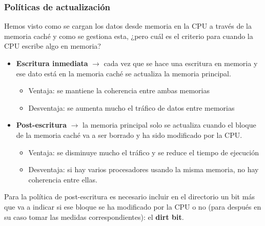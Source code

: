 \documentclass[a4paper,10pt]{book}
\begin{document}
\subsubsection*{Políticas de actualización}
Hemos visto como se cargan los datos desde memoria en la CPU a través de la memoria caché y como se gestiona esta, ¿pero cuál es el criterio para cuando la CPU escribe algo en memoria?
\begin{itemize}
\item \textbf{Escritura inmediata} $\rightarrow $ cada vez que se hace una escritura en memoria y ese dato está en la memoria caché se actualiza la memoria principal.
	\begin{itemize}
	\item Ventaja: se mantiene la coherencia entre ambas memorias
	\item Desventaja: se aumenta mucho el tráfico de datos entre memorias
	\end{itemize}
\item \textbf{Post-escritura} $\rightarrow $ la memoria principal solo se actualiza cuando el bloque de la memoria caché va a ser borrado y ha sido modificado por la CPU.
	\begin{itemize}
	\item Ventaja: se disminuye mucho el tráfico y se reduce el tiempo de ejecución
	\item Desventaja: si hay varios procesadores usando la misma memoria, no hay coherencia entre ellas.
	\end{itemize}
\end{itemize}
Para la política de post-escritura es necesario incluir en el directorio un bit más que va a indicar si ese bloque se ha modificado por la CPU o no (para después en su caso tomar las medidas correspondientes): el \textbf{dirt bit}.
\end{document}
